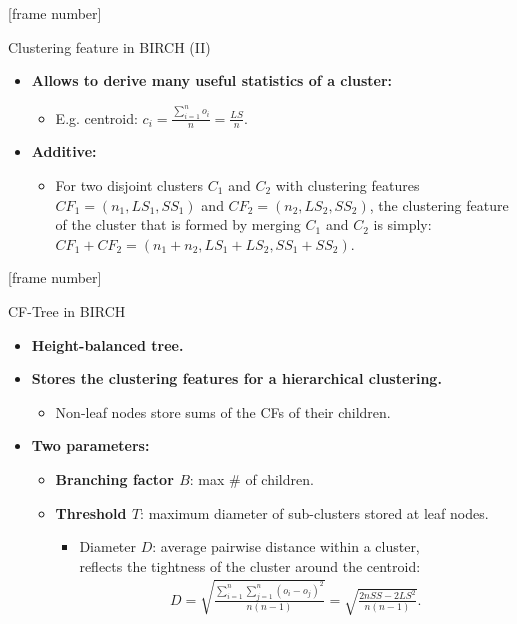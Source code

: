 \documentclass[aspectratio=169,t,xcolor=dvipsnames]{beamer}
\begin{document}
  { %
    [frame number]
    \begin{frame}{Clustering feature in BIRCH (II)}
      \begin{itemize}
        \item \textbf{Allows to derive many useful statistics of a cluster:}
        \begin{itemize}
          \item E.g. centroid: $c_i = \frac{\sum_{i=1}^{n}o_i}{n} = \frac{LS}{n}$.
        \end{itemize}
        \item \textbf{Additive:}
        \begin{itemize}
          \item For two disjoint clusters $C_1$ and $C_2$ with clustering features $CF_1 = (n_1, LS_1, SS_1)$ and $CF_2 = (n_2, LS_2, SS_2)$, the clustering feature of the cluster that is formed by merging $C_1$ and $C_2$ is simply: $CF_1 + CF_2 = (n_1 + n_2, LS_1 + LS_2, SS_1 + SS_2)$.
        \end{itemize}
      \end{itemize}
    \end{frame}
  }

  { %
    [frame number]
    \begin{frame}{CF-Tree in BIRCH}
      \begin{itemize}
        \item \textbf{Height-balanced tree.}
        \item \textbf{Stores the clustering features for a hierarchical clustering.}
        \begin{itemize}
          \item Non-leaf nodes store sums of the CFs of their children.
        \end{itemize}
        \item \textbf{Two parameters:}
        \begin{itemize}
          \item \textbf{\color{airforceblue}Branching factor $B$}: max \# of children.
          \item \textbf{\color{airforceblue}Threshold $T$}: maximum diameter of sub-clusters stored at leaf nodes.
          \begin{itemize}
            \item Diameter $D$: average pairwise distance within a cluster, \\
            reflects the tightness of the cluster around the centroid:
            \begin{align}
              D = \sqrt{\frac{\sum_{i=1}^{n} \sum_{j=1}^{n} (o_i-o_j)^2}{n(n-1)}} = \sqrt{\frac{2nSS - 2LS^2}{n(n-1)}}.
            \end{align}
          \end{itemize}
        \end{itemize}
      \end{itemize}
    \end{frame}
  }
\end{document}
